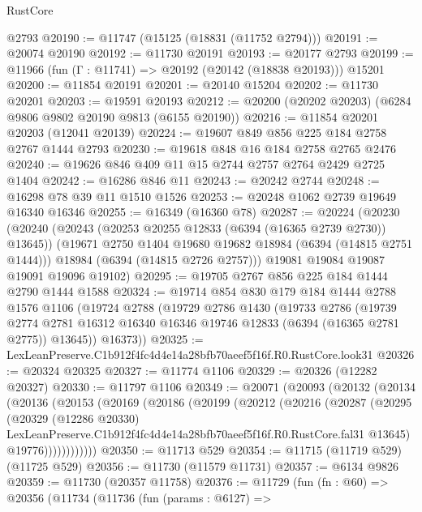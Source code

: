 \begin{lexlean}{RustCore}
\begin{coremodule}
    @2793
@20190 := @11747 (@15125 (@18831 (@11752 @2794)))
@20191 := @20074 @20190
@20192 := @11730 @20191
@20193 := @20177 @2793
@20199 := @11966 (fun (Γ : @11741) => @20192 (@20142 (@18838 @20193))) @15201
@20200 := @11854 @20191
@20201 := @20140 @15204
@20202 := @11730 @20201
@20203 := @19591 @20193
@20212 := @20200 (@20202 @20203) (@6284 @9806 @9802 @20190 @9813 (@6155 @20190))
@20216 := @11854 @20201 @20203 (@12041 @20139)
@20224 := @19607 @849 @856 @225 @184 @2758 @2767 @1444 @2793
@20230 := @19618 @848 @16 @184 @2758 @2765 @2476
@20240 := @19626 @846 @409 @11 @15 @2744 @2757 @2764 @2429 @2725 @1404
@20242 := @16286 @846 @11
@20243 := @20242 @2744
@20248 := @16298 @78 @39 @11 @1510 @1526
@20253 := @20248 @1062 @2739 @19649 @16340 @16346
@20255 := @16349 (@16360 @78)
@20287 := @20224
    (@20230
      (@20240
        (@20243 (@20253 @20255 @12833 (@6394 (@16365 @2739 @2730)) @13645))
        (@19671 @2750 @1404 @19680 @19682 @18984 (@6394 (@14815 @2751 @1444)))
        @18984
        (@6394 (@14815 @2726 @2757)))
      @19081
      @19084
      @19087
      @19091
      @19096
      @19102)
@20295 := @19705 @2767 @856 @225 @184 @1444 @2790 @1444 @1588
@20324 := @19714
    @854
    @830
    @179
    @184
    @1444
    @2788
    @1576
    @1106
    (@19724
      @2788
      (@19729
        @2786
        @1430
        (@19733
          @2786
          (@19739
            @2774
            @2781
            @16312
            @16340
            @16346
            @19746
            @12833
            (@6394 (@16365 @2781 @2775))
            @13645))
        @16373))
@20325 := LexLeanPreserve.C1b912f4fc4d4e14a28bfb70aeef5f16f.R0.RustCore.look31
@20326 := @20324 @20325
@20327 := @11774 @1106
@20329 := @20326 (@12282 @20327)
@20330 := @11797 @1106
@20349 := @20071
    (@20093
      (@20132
        (@20134
          (@20136
            (@20153
              (@20169
                (@20186
                  (@20199
                    (@20212
                      (@20216
                        (@20287
                          (@20295
                            (@20329
                              (@12286 @20330)
                              LexLeanPreserve.C1b912f4fc4d4e14a28bfb70aeef5f16f.R0.RustCore.fal31
                              @13645)
                            @19776))))))))))))
@20350 := @11713 @529
@20354 := @11715 (@11719 @529) (@11725 @529)
@20356 := @11730 (@11579 @11731)
@20357 := @6134 @9826
@20359 := @11730 (@20357 @11758)
@20376 := @11729
    (fun (fn : @60) =>
    @20356
      (@11734
        (@11736
          (fun (params : @6127) =>

\end{coremodule}
\end{lexlean}
